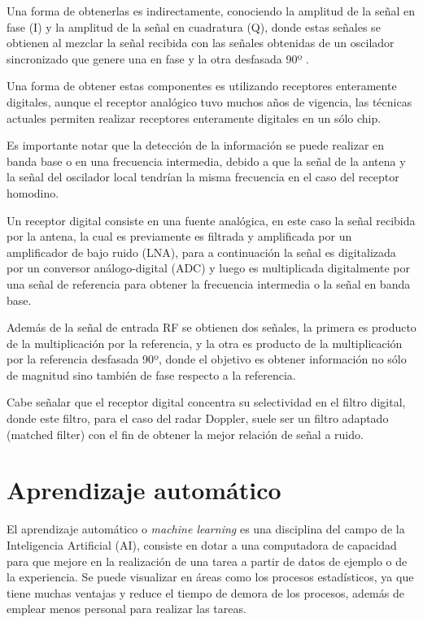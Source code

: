 Una forma de obtenerlas es indirectamente, conociendo la amplitud de la señal en fase (I) y la amplitud de la señal en cuadratura (Q), donde estas señales se obtienen al mezclar la señal recibida con las señales obtenidas de un oscilador sincronizado que genere una en fase y la otra desfasada 90º \cite{CastilloPlasencia2016Oct}.

Una forma de obtener estas componentes es utilizando receptores enteramente digitales, aunque el receptor analógico tuvo muchos años de vigencia, las técnicas actuales permiten realizar receptores enteramente digitales en un sólo chip.

Es importante notar que la detección de la información se puede realizar en banda base o en una frecuencia intermedia, debido a que la señal de la antena y la señal del oscilador local tendrían la misma frecuencia en el caso del receptor homodino. 

Un receptor digital consiste en una fuente analógica, en este caso la señal recibida por la antena, la cual es previamente es filtrada y amplificada por un amplificador de bajo ruido (LNA), para a continuación la señal es digitalizada por un conversor análogo-digital (ADC) y luego es multiplicada digitalmente por una señal de referencia para obtener la frecuencia intermedia o la señal en banda base. 

Además de la señal de entrada RF se obtienen dos señales, la primera es producto de la multiplicación por la referencia, y la otra es producto de la multiplicación por la referencia desfasada 90º, donde el objetivo es obtener información no sólo de magnitud sino también de fase respecto a la referencia.

Cabe señalar que el receptor digital concentra su selectividad en el filtro digital, donde este filtro, para el caso del radar Doppler, suele ser un filtro adaptado (matched filter) con el fin de obtener la mejor relación de señal a ruido.


\section{Aprendizaje automático}

El aprendizaje automático o \textit{machine learning} es una disciplina del campo de la Inteligencia Artificial (AI),
consiste en dotar a una computadora de capacidad para que mejore en la realización de una tarea a partir de datos de ejemplo o de la experiencia. Se puede visualizar en áreas como los procesos estadísticos, ya que tiene muchas ventajas y reduce el tiempo de demora de los procesos, además de emplear menos personal para realizar las tareas.

